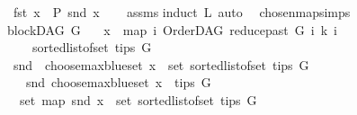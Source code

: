 \begin{isabellebody}
\ \ \ \ {\isachardoublequoteopen}fst\ x\ {\isacharequal}{\kern0pt}\ P\ {\isacharparenleft}{\kern0pt}snd\ x{\isacharparenright}{\kern0pt}{\isachardoublequoteclose}\isanewline
%
\isadelimproof
\ \ %
\endisadelimproof
%
\isatagproof
{}\isamarkupfalse%
\ assms\isanewline
{}\isamarkupfalse%
{\isacharparenleft}{\kern0pt}induct\ L{\isacharcomma}{\kern0pt}\ auto{\isacharparenright}{\kern0pt}\ \isamarkupfalse%
%
\endisatagproof
{\isafoldproof}%
%
\isadelimproof
\isanewline
%
\endisadelimproof
\isanewline
{}\isamarkupfalse%
\ chosen{\isacharunderscore}{\kern0pt}map{\isacharunderscore}{\kern0pt}simps{\isacharcolon}{\kern0pt}\isanewline
\ \ \ {\isachardoublequoteopen}blockDAG\ G{\isachardoublequoteclose}\isanewline
\ \ \ {\isachardoublequoteopen}x\ {\isacharequal}{\kern0pt}\ map\ {\isacharparenleft}{\kern0pt}{\isasymlambda}i{\isachardot}{\kern0pt}\ {\isacharparenleft}{\kern0pt}OrderDAG\ {\isacharparenleft}{\kern0pt}reduce{\isacharunderscore}{\kern0pt}past\ G\ i{\isacharparenright}{\kern0pt}\ k{\isacharcomma}{\kern0pt}\ i{\isacharparenright}{\kern0pt}{\isacharparenright}{\kern0pt}\isanewline
\ \ \ \ \ \ \ {\isacharparenleft}{\kern0pt}sorted{\isacharunderscore}{\kern0pt}list{\isacharunderscore}{\kern0pt}of{\isacharunderscore}{\kern0pt}set\ {\isacharparenleft}{\kern0pt}tips\ G{\isacharparenright}{\kern0pt}{\isacharparenright}{\kern0pt}{\isachardoublequoteclose}\ \isanewline
\ \ \ \ {\isachardoublequoteopen}snd\ \ {\isacharparenleft}{\kern0pt}choose{\isacharunderscore}{\kern0pt}max{\isacharunderscore}{\kern0pt}blue{\isacharunderscore}{\kern0pt}set\ x{\isacharparenright}{\kern0pt}\ {\isasymin}\ set\ {\isacharparenleft}{\kern0pt}sorted{\isacharunderscore}{\kern0pt}list{\isacharunderscore}{\kern0pt}of{\isacharunderscore}{\kern0pt}set\ {\isacharparenleft}{\kern0pt}tips\ G{\isacharparenright}{\kern0pt}{\isacharparenright}{\kern0pt}{\isachardoublequoteclose}\ \isanewline
\ \ \ \ \ \ {\isachardoublequoteopen}snd\ {\isacharparenleft}{\kern0pt}choose{\isacharunderscore}{\kern0pt}max{\isacharunderscore}{\kern0pt}blue{\isacharunderscore}{\kern0pt}set\ x{\isacharparenright}{\kern0pt}\ {\isasymin}\ tips\ G{\isachardoublequoteclose}\isanewline
\ \ \ \ \ {\isachardoublequoteopen}set\ {\isacharparenleft}{\kern0pt}map\ snd\ x{\isacharparenright}{\kern0pt}\ {\isacharequal}{\kern0pt}\ set\ {\isacharparenleft}{\kern0pt}sorted{\isacharunderscore}{\kern0pt}list{\isacharunderscore}{\kern0pt}of{\isacharunderscore}{\kern0pt}set\ {\isacharparenleft}{\kern0pt}tips\ G{\isacharparenright}{\kern0pt}{\isacharparenright}{\kern0pt}{\isachardoublequoteclose}\isanewline

\end{isabellebody}
